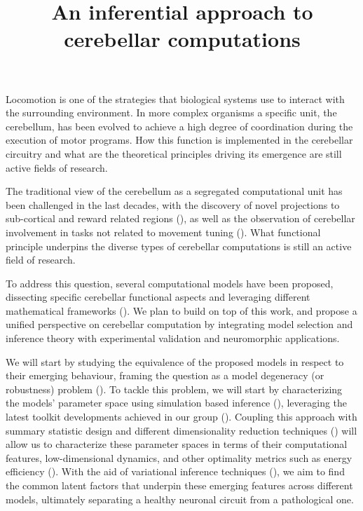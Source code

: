 \documentclass[a4paper, 10pt]{article}
\title{An inferential approach to cerebellar computations}
\author{}
\begin{document}
\maketitle
Locomotion is one of the strategies that biological systems use to interact with
the surrounding environment. In more complex organisms a specific unit, the
cerebellum, has been evolved to achieve a high degree of coordination during the
execution of motor programs. How this function is implemented in the
cerebellar circuitry and what are the theoretical principles driving its
emergence are still active fields of research.

The traditional view of the cerebellum as a segregated computational unit has
been challenged in the last decades, with the discovery of novel projections to
sub-cortical and reward related regions (\cite{Washburn2024TheCD,
  Ohmae2015ClimbingFE, Bostan2010TheBG, Washburn2024TheCD,
Wagner2017CerebellarGC, Ohmae2015ClimbingFE}), as well as the observation of
cerebellar involvement in tasks not related to movement tuning
(\cite{Strick2009CerebellumAN, Overwalle2014SocialCA}). What functional
principle underpins the diverse types of cerebellar computations is
still an active field of research.

To address this question, several computational models have been proposed,
dissecting specific cerebellar functional aspects and leveraging different
mathematical frameworks (\cite{DeSchepper2021ModelSU, DAngelo2016ModelingTC,
Diedrichsen2019UniversalTO}). We plan to build on top of this work, and propose
a unified perspective on cerebellar computation by integrating model selection
and inference theory with experimental validation and neuromorphic applications.

We will start by studying the equivalence of the proposed models in respect to
their emerging behaviour, framing the question as a model degeneracy (or
robustness) problem (\cite{Calaim2022TheGO, Gonalves2019TrainingDN}). To tackle
this problem, we will start by characterizing the models' parameter space using
simulation based inference (\cite{Lueckmann2017FlexibleSI}), leveraging the
latest toolkit developments achieved in our group (\cite{TejeroCantero2020sbiAT,
Deistler2024DifferentiableSE}). Coupling this approach with summary statistic
design and different dimensionality reduction techniques
(\cite{Pellegrino2024DimensionalityRB, Cenedese2022DatadrivenMA}) will allow us
to characterize these parameter spaces in terms of their computational features,
low-dimensional dynamics, and other optimality metrics such as energy efficiency
(\cite{Jedlicka2022ParetoOE}). With the aid of variational inference techniques
(\cite{Bishop2012PatternRA, Luo2022UnderstandingDM}), we aim to find the common
latent factors that underpin these emerging features across different models,
ultimately separating a healthy neuronal circuit from a pathological one.
\end{document}
